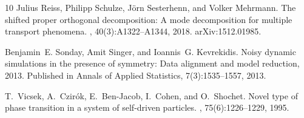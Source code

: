 \documentclass{report}
\theoremstyle{plain}
\theoremstyle{remark}
\numberwithin{equation}{section}              %
\begin{document}
\begin{thebibliography}{10}
Julius Reiss, Philipp Schulze, J{\"o}rn Sesterhenn, and Volker Mehrmann.
\newblock The shifted proper orthogonal decomposition: A mode decomposition for
  multiple transport phenomena.
, 40(3):A1322--A1344, 2018.
\newblock arXiv:1512.01985.

Benjamin~E. Sonday, Amit Singer, and Ioannis~G. Kevrekidis.
\newblock Noisy dynamic simulations in the presence of symmetry: Data alignment
  and model reduction, 2013.
\newblock Published in Annals of Applied Statistics, 7(3):1535--1557, 2013.

T.~Vicsek, A.~Czir{\'o}k, E.~Ben-Jacob, I.~Cohen, and O.~Shochet.
\newblock Novel type of phase transition in a system of self-driven particles.
, 75(6):1226--1229, 1995.

\end{thebibliography}
\end{document}
